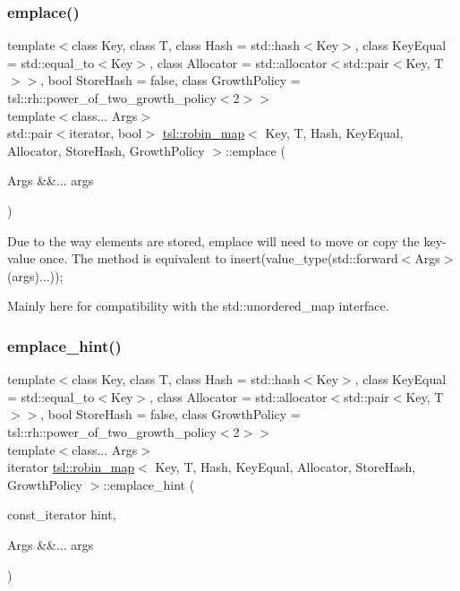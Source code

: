 \subsubsection{\texorpdfstring{emplace()}{emplace()}}
{\footnotesize\ttfamily template$<$class Key, class T, class Hash = std\+::hash$<$\+Key$>$, class Key\+Equal = std\+::equal\+\_\+to$<$\+Key$>$, class Allocator = std\+::allocator$<$std\+::pair$<$\+Key, T$>$$>$, bool Store\+Hash = false, class Growth\+Policy = tsl\+::rh\+::power\+\_\+of\+\_\+two\+\_\+growth\+\_\+policy$<$2$>$$>$ \\
template$<$class... Args$>$ \\
std\+::pair$<$iterator, bool$>$ \mbox{\hyperlink{classtsl_1_1robin__map}{tsl\+::robin\+\_\+map}}$<$ Key, T, Hash, Key\+Equal, Allocator, Store\+Hash, Growth\+Policy $>$\+::emplace (\begin{DoxyParamCaption}\item[{Args \&\&...}]{args }\end{DoxyParamCaption})\hspace{0.3cm}{\ttfamily [inline]}}

Due to the way elements are stored, emplace will need to move or copy the key-\/value once. The method is equivalent to insert(value\+\_\+type(std\+::forward$<$\+Args$>$(args)...));

Mainly here for compatibility with the std\+::unordered\+\_\+map interface. \mbox{\label{classtsl_1_1robin__map_ad3db483f5b734b8450f9c9a32ef393b3}} 
\subsubsection{\texorpdfstring{emplace\_hint()}{emplace\_hint()}}
{\footnotesize\ttfamily template$<$class Key, class T, class Hash = std\+::hash$<$\+Key$>$, class Key\+Equal = std\+::equal\+\_\+to$<$\+Key$>$, class Allocator = std\+::allocator$<$std\+::pair$<$\+Key, T$>$$>$, bool Store\+Hash = false, class Growth\+Policy = tsl\+::rh\+::power\+\_\+of\+\_\+two\+\_\+growth\+\_\+policy$<$2$>$$>$ \\
template$<$class... Args$>$ \\
iterator \mbox{\hyperlink{classtsl_1_1robin__map}{tsl\+::robin\+\_\+map}}$<$ Key, T, Hash, Key\+Equal, Allocator, Store\+Hash, Growth\+Policy $>$\+::emplace\+\_\+hint (\begin{DoxyParamCaption}\item[{const\+\_\+iterator}]{hint,  }\item[{Args \&\&...}]{args }\end{DoxyParamCaption})\hspace{0.3cm}{\ttfamily [inline]}}

